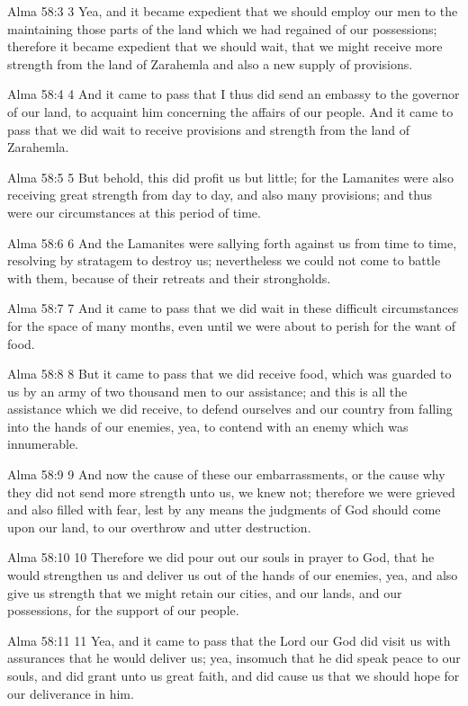 Alma 58:3
 3 Yea, and it became expedient that we should employ our men to
the maintaining those parts of the land which we had regained of
our possessions; therefore it became expedient that we should
wait, that we might receive more strength from the land of
Zarahemla and also a new supply of provisions.

Alma 58:4
 4 And it came to pass that I thus did send an embassy to the
governor of our land, to acquaint him concerning the affairs of
our people. And it came to pass that we did wait to receive
provisions and strength from the land of Zarahemla.

Alma 58:5
 5 But behold, this did profit us but little; for the Lamanites
were also receiving great strength from day to day, and also many
provisions; and thus were our circumstances at this period of
time.

Alma 58:6
 6 And the Lamanites were sallying forth against us from time to
time, resolving by stratagem to destroy us; nevertheless we could
not come to battle with them, because of their retreats and their
strongholds.

Alma 58:7
 7 And it came to pass that we did wait in these difficult
circumstances for the space of many months, even until we were
about to perish for the want of food.

Alma 58:8
 8 But it came to pass that we did receive food, which was
guarded to us by an army of two thousand men to our assistance;
and this is all the assistance which we did receive, to defend
ourselves and our country from falling into the hands of our
enemies, yea, to contend with an enemy which was innumerable.

Alma 58:9
 9 And now the cause of these our embarrassments, or the cause
why they did not send more strength unto us, we knew not;
therefore we were grieved and also filled with fear, lest by any
means the judgments of God should come upon our land, to our
overthrow and utter destruction.

Alma 58:10
 10 Therefore we did pour out our souls in prayer to God, that he
would strengthen us and deliver us out of the hands of our
enemies, yea, and also give us strength that we might retain our
cities, and our lands, and our possessions, for the support of
our people.

Alma 58:11
 11 Yea, and it came to pass that the Lord our God did visit us
with assurances that he would deliver us; yea, insomuch that he
did speak peace to our souls, and did grant unto us great faith,
and did cause us that we should hope for our deliverance in him.

